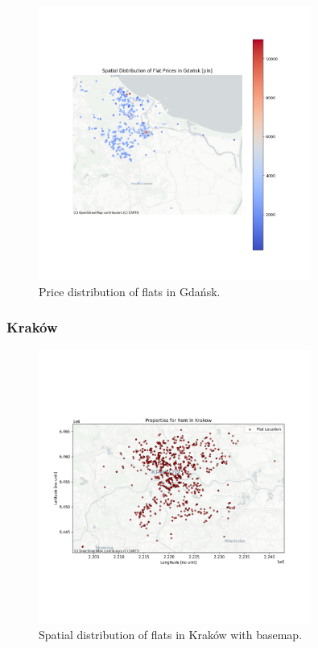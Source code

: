     \begin{figure}[H]
        \centering
        \includegraphics[width=0.8\textwidth]{figures/gdansk_price_distribution.png}
        \caption{Price distribution of flats in Gdańsk.}
        \label{fig:gdansk_price_distribution}
    \end{figure}

    \subsubsection{Kraków}
    \begin{figure}[H]
        \centering
        \includegraphics[width=0.8\textwidth]{figures/krakow_flats_map_with_basemap.png}
        \caption{Spatial distribution of flats in Kraków with basemap.}
        \label{fig:krakow_basemap}
    \end{figure}


